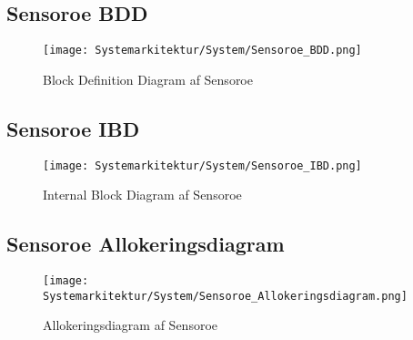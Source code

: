 
\subsection{Sensoroe BDD}

\begin{figure}[H]
	\centering
	\texttt{[image: Systemarkitektur/System/Sensoroe\_BDD.png]}
	\label{fig:Sensoroe BDD}
	\caption{Block Definition Diagram af Sensoroe}
\end{figure}



\subsection{Sensoroe IBD}

\begin{figure}[H]
	\centering
	\texttt{[image: Systemarkitektur/System/Sensoroe\_IBD.png]}
	\label{fig:Sensoroe BDD}
	\caption{Internal Block Diagram af Sensoroe}
\end{figure}



\subsection{Sensoroe Allokeringsdiagram}

\begin{figure}[H]
	\centering
	\texttt{[image: Systemarkitektur/System/Sensoroe\_Allokeringsdiagram.png]}
	\label{fig:Sensoroe BDD}
	\caption{Allokeringsdiagram af Sensoroe}
\end{figure}